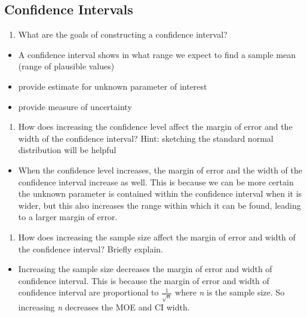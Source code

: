 \documentclass[
  openany]{book}
\providecommand{\tightlist}{%
  \setlength{\itemsep}{0pt}\setlength{\parskip}{0pt}}
\begin{document}
\subsection{Confidence Intervals}\label{confidence-intervals-1}

\begin{enumerate}
\def\labelenumi{\arabic{enumi}.}
\setcounter{enumi}{2}
\tightlist
\item
  What are the goals of constructing a confidence interval?
\end{enumerate}

\begin{itemize}
\tightlist
\item
  A confidence interval shows in what range we expect to find a sample mean (range of plausible values)
\item
  provide estimate for unknown parameter of interest
\item
  provide measure of uncertainty
\end{itemize}

\begin{enumerate}
\def\labelenumi{\arabic{enumi}.}
\setcounter{enumi}{3}
\tightlist
\item
  How does increasing the confidence level affect the margin of error and the width of the confidence interval? Hint: sketching the standard normal distribution will be helpful
\end{enumerate}

\begin{itemize}
\tightlist
\item
  When the confidence level increases, the margin of error and the width of the confidence interval increase as well. This is because we can be more certain the unknown parameter is contained within the confidence interval when it is wider, but this also increases the range within which it can be found, leading to a larger margin of error.
\end{itemize}

\begin{enumerate}
\def\labelenumi{\arabic{enumi}.}
\setcounter{enumi}{4}
\tightlist
\item
  How does increasing the sample size affect the margin of error and width of the confidence interval? Briefly explain.
\end{enumerate}

\begin{itemize}
\tightlist
\item
  Increasing the sample size decreases the margin of error and width of confidence interval. This is because the margin of error and width of confidence interval are proportional to \(\frac{1}{\sqrt{n}}\) where \emph{n} is the sample size. So increasing \emph{n} decreases the MOE and CI width.
\end{itemize}
\end{document}
